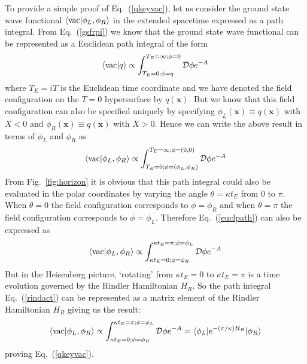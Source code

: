\documentclass[12pt]{iopart}
\def\eq#1{{Eq.~(\ref{#1})}}
\begin{document}
To provide a simple  proof of \eq{qkeyvac}, let us consider
the ground state wave functional $\langle {\rm vac} |\phi_L , \phi_R\rangle $ in the extended spacetime
expressed as a path integral. From \eq{gsfrpi} we know that the ground state wave functional can be represented
as a Euclidean path integral of the form
\begin{equation}
\langle {\rm vac} |q\rangle \propto \int_{T_E=0;\phi=q}^{T_E=\infty;\phi=0}
\mathcal{D}\phi e^{-A}\label{euclpath1}
\end{equation}
where $T_E=iT $ is the Euclidean time coordinate and
 we have denoted the field configuration on the $T=0$ hypersurface by
$q(\mathbf{x})$. But we know that this field configuration can also be specified uniquely by specifying $\phi_L(\mathbf{x})\equiv q(\mathbf{x})$ with $X<0$ and $\phi_R(\mathbf{x})\equiv q(\mathbf{x})$ with $X>0$. Hence we can write the above result in terms of $\phi_L$ and $\phi_R$ as 
\begin{equation}
\langle {\rm vac} |\phi_L , \phi_R \rangle \propto \int_{T_E=0;\phi=(\phi_L,\phi_R)}^{T_E=\infty;\phi=(0,0)}
\mathcal{D}\phi e^{-A}\label{euclpath}
\end{equation}
   From Fig.~\ref{fig:horizon}  it is obvious that
  this path integral could also be evaluated in the polar coordinates by varying the angle
  $\theta =\kappa  t_E$ from 0 to $\pi$. When $\theta =0$ the field configuration corresponds to 
  $\phi = \phi_R$ and when $\theta = \pi$ the field configuration corresponds to $\phi = \phi_L$.
  Therefore \eq{euclpath} can also  be expressed as
  \begin{equation}
\langle {\rm vac} |\phi_L , \phi_R \rangle \propto \int_{\kappa t_E=0;\phi=\phi_R}^{\kappa t_E=\pi;\phi=\phi_L}
\mathcal{D}\phi e^{-A}
\label{rindact}
\end{equation}
   But in the
    Heisenberg picture, `rotating' from $\kappa t_E =0$ to 
    $\kappa t_E =\pi$ is a time evolution governed by the Rindler Hamiltonian $H_R$. So the path integral \eq{rindact} can be represented  as a matrix element of the Rindler Hamiltonian $H_R$
    giving us the result:   
    \begin{equation}
\langle {\rm vac} |\phi_L , \phi_R \rangle \propto \int_{\kappa t_E=0;\phi=\phi_R}^{\kappa t_E=\pi;\phi=\phi_L}
\mathcal{D}\phi e^{-A} 
= \langle \phi_L|e^{-(\pi/\kappa )H_R}|\phi_R\rangle
\end{equation}
proving \eq{qkeyvac}.
\end{document}
